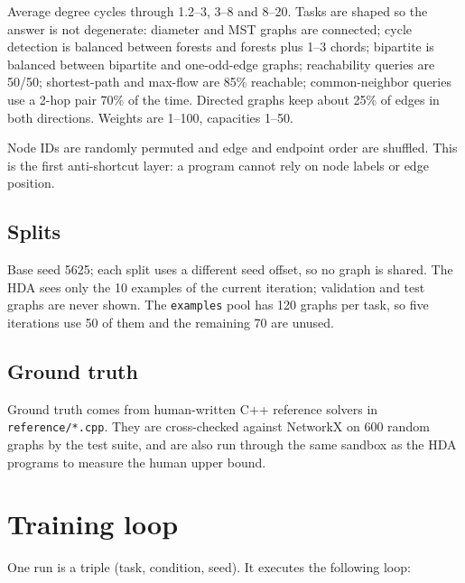 \documentclass[11pt]{article}
\begin{document}
Average degree cycles through 1.2--3, 3--8 and 8--20. Tasks are shaped so the
answer is not degenerate: diameter and MST graphs are connected; cycle
detection is balanced between forests and forests plus 1--3 chords; bipartite
is balanced between bipartite and one-odd-edge graphs; reachability queries are
50/50; shortest-path and max-flow are 85\% reachable; common-neighbor queries
use a 2-hop pair 70\% of the time. Directed graphs keep about 25\% of edges in
both directions. Weights are 1--100, capacities 1--50.

Node IDs are randomly permuted and edge and endpoint order are shuffled. This
is the first anti-shortcut layer: a program cannot rely on node labels or edge
position.

\subsection{Splits}

\begin{table}[h]
\centering
\small

\caption{Splits, node ranges, per-task counts, families and CPU limits.}
\end{table}

Base seed 5625; each split uses a different seed offset, so no graph is shared.
The HDA sees only the 10 examples of the current iteration; validation and test
graphs are never shown. The \texttt{examples} pool has 120 graphs per task, so
five iterations use 50 of them and the remaining 70 are unused.

\subsection{Ground truth}

Ground truth comes from human-written C++ reference solvers in
\texttt{reference/*.cpp}. They are cross-checked against NetworkX on 600 random
graphs by the test suite, and are also run through the same sandbox as the HDA
programs to measure the human upper bound.

\section{Training loop}

One run is a triple (task, condition, seed). It executes the following loop:
\end{document}
